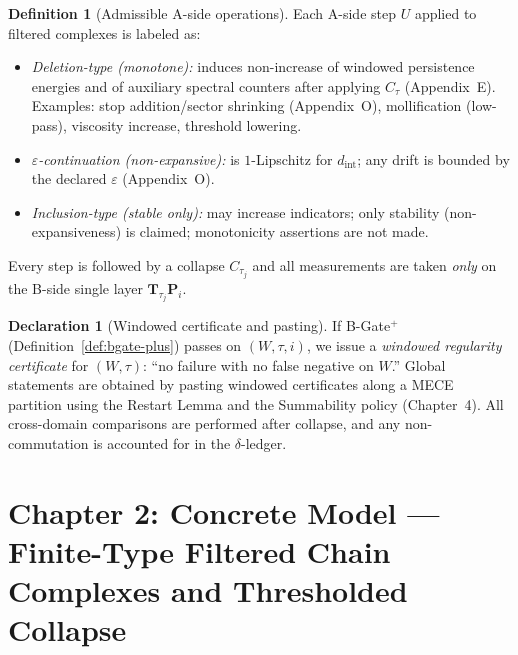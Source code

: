 \documentclass[11pt]{article}
\numberwithin{equation}{section}
\theoremstyle{definition}
\newtheorem{definition}[theorem]{Definition}
\newtheorem{declaration}[theorem]{Declaration}
\begin{document}
\begin{definition}[Admissible A-side operations]\label{def:admissible-ops}
Each A-side step $U$ applied to filtered complexes is labeled as:
\begin{itemize}
  \item \emph{Deletion-type (monotone):} induces non-increase of windowed persistence energies and of auxiliary spectral counters after applying $C_\tau$ (Appendix~E). Examples: stop addition/sector shrinking (Appendix~O), mollification (low-pass), viscosity increase, threshold lowering.
  \item \emph{$\varepsilon$-continuation (non-expansive):} is $1$-Lipschitz for $d_{\mathrm{int}}$; any drift is bounded by the declared $\varepsilon$ (Appendix~O).
  \item \emph{Inclusion-type (stable only):} may increase indicators; only stability (non-expansiveness) is claimed; monotonicity assertions are not made.
\end{itemize}
Every step is followed by a collapse $C_{\tau_j}$ and all measurements are taken \emph{only} on the B-side single layer $\mathbf{T}_{\tau_j}\mathbf{P}_i$.
\end{definition}

\begin{declaration}[Windowed certificate and pasting]\label{dec:windowed-certificate}
If B-Gate$^{+}$ (Definition~\ref{def:bgate-plus}) passes on $(W,\tau,i)$, we issue a \emph{windowed regularity certificate} for $(W,\tau)$: “no failure with no false negative on $W$.” Global statements are obtained by pasting windowed certificates along a MECE partition using the Restart Lemma and the Summability policy (Chapter~4). All cross-domain comparisons are performed after collapse, and any non-commutation is accounted for in the $\delta$-ledger.
\end{declaration}



\section{Chapter 2: Concrete Model — Finite-Type Filtered Chain Complexes and Thresholded Collapse}
\end{document}
